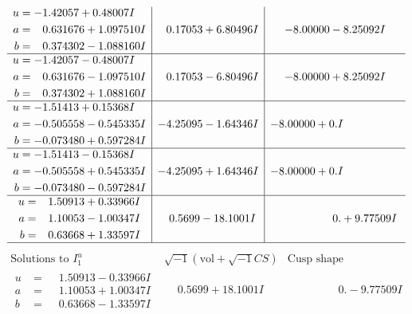 \documentclass[1p]{elsarticle_modified}
\theoremstyle{definition}
\newcommand{\I}{\sqrt{-1}}
\begin{document}
$$\begin{array}{c|c|c}
\begin{aligned}
u &= -1.42057 + 0.48007 I \\
a &= \phantom{-}0.631676 + 1.097510 I \\
b &= \phantom{-}0.374302 - 1.088160 I\end{aligned}
 & \phantom{-}0.17053 + 6.80496 I & -8.00000 - 8.25092 I \\ \hline\begin{aligned}
u &= -1.42057 - 0.48007 I \\
a &= \phantom{-}0.631676 - 1.097510 I \\
b &= \phantom{-}0.374302 + 1.088160 I\end{aligned}
 & \phantom{-}0.17053 - 6.80496 I & -8.00000 + 8.25092 I \\ \hline\begin{aligned}
u &= -1.51413 + 0.15368 I \\
a &= -0.505558 - 0.545335 I \\
b &= -0.073480 + 0.597284 I\end{aligned}
 & -4.25095 - 1.64346 I & -8.00000 + 0. I\phantom{ +0.000000I} \\ \hline\begin{aligned}
u &= -1.51413 - 0.15368 I \\
a &= -0.505558 + 0.545335 I \\
b &= -0.073480 - 0.597284 I\end{aligned}
 & -4.25095 + 1.64346 I & -8.00000 + 0. I\phantom{ +0.000000I} \\ \hline\begin{aligned}
u &= \phantom{-}1.50913 + 0.33966 I \\
a &= \phantom{-}1.10053 - 1.00347 I \\
b &= \phantom{-}0.63668 + 1.33597 I\end{aligned}
 & \phantom{-}0.5699 - 18.1001 I & \phantom{-0.000000 -}0. + 9.77509 I\\
 \hline 
 \end{array}$$\newpage$$\begin{array}{c|c|c}  
\text{Solutions to }I^u_{1}& \I (\text{vol} + \sqrt{-1}CS) & \text{Cusp shape}\\
 \hline 
\begin{aligned}
u &= \phantom{-}1.50913 - 0.33966 I \\
a &= \phantom{-}1.10053 + 1.00347 I \\
b &= \phantom{-}0.63668 - 1.33597 I\end{aligned}
 & \phantom{-}0.5699 + 18.1001 I & \phantom{-0.000000 } 0. - 9.77509 I \\ \hline\begin{aligned}

\end{aligned}
\end{array}$$
\end{document}
